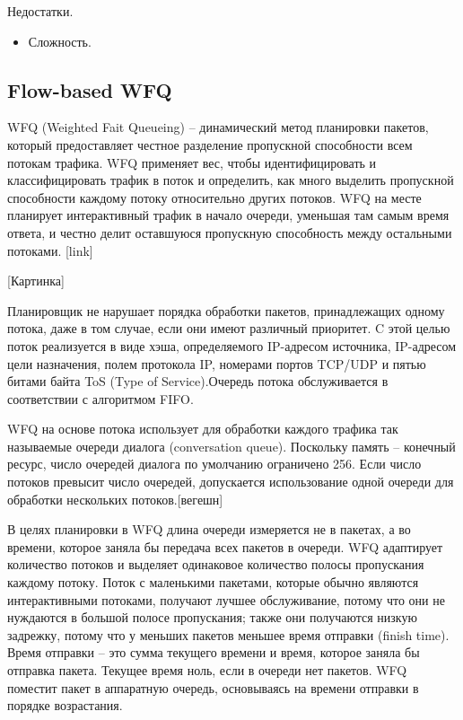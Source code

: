         Недостатки.
		\begin{itemize}
            \item Сложность.
		\end{itemize}

	\subsection{Flow-based WFQ}

	WFQ (Weighted Fait Queueing) -- динамический метод планировки пакетов, который
	предоставляет честное разделение пропускной способности всем потокам трафика.
	WFQ применяет вес, чтобы идентифицировать и классифицировать трафик
	в поток и определить, как много выделить пропускной способности каждому
	потоку относительно других потоков. WFQ на месте планирует интерактивный трафик в начало очереди,
	уменьшая там самым время ответа, и честно делит оставшуюся пропускную
	способность между остальными потоками. 
	[link]

	[Картинка]
	

	Планировщик не нарушает порядка обработки пакетов,
	принадлежащих одному потока, даже в том случае, если они имеют различный приоритет.
	C этой целью поток реализуется в виде хэша, определяемого IP-адресом источника,
	IP-адресом цели назначения, полем протокола IP, номерами портов TCP/UDP и пятью
	битами байта ToS (Type of Service).Очередь потока обслуживается в соответствии с алгоритмом FIFO.


	WFQ на основе потока использует для обработки каждого трафика так называемые
	очереди диалога (conversation queue).
	Поскольку память -- конечный ресурс, число очередей диалога по умолчанию
	ограничено 256. Если число потоков превысит число очередей, допускается
	использование одной очереди для обработки нескольких потоков.[вегешн]

	В целях планировки в WFQ длина очереди измеряется не в пакетах, а во времени,
	которое заняла бы передача всех пакетов в очереди. WFQ адаптирует количество
	потоков и выделяет одинаковое количество полосы пропускания каждому потоку.
	Поток с маленькими пакетами, которые обычно являются интерактивными потоками,
	получают лучшее обслуживание, потому что они не нуждаются в большой полосе пропускания;
	также они получаются низкую задрежку, потому что у меньших пакетов меньшее
	время отправки (finish time). Время отправки -- это сумма текущего времени и
	время, которое заняла бы отправка пакета. Текущее время ноль, если в очереди
	нет пакетов. WFQ поместит пакет в аппаратную очередь, основываясь на времени отправки в
	порядке возрастания.

